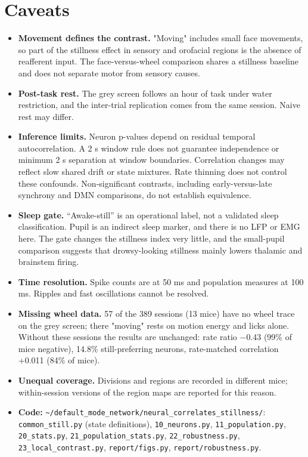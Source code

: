 \documentclass[10pt,a4paper]{article}
\begin{document}
\section{Caveats}
\begin{itemize}
\item \textbf{Movement defines the contrast.} "Moving" includes small face movements, so part of the stillness effect in sensory and orofacial regions is the absence of reafferent input. The face-versus-wheel comparison shares a stillness baseline and does not separate motor from sensory causes.
\item \textbf{Post-task rest.} The grey screen follows an hour of task under water restriction, and the inter-trial replication comes from the same session. Naive rest may differ.
\item \textbf{Inference limits.} Neuron p-values depend on residual temporal autocorrelation. A 2 s window rule does not guarantee independence or minimum 2 s separation at window boundaries. Correlation changes may reflect slow shared drift or state mixtures. Rate thinning does not control these confounds. Non-significant contrasts, including early-versus-late synchrony and DMN comparisons, do not establish equivalence.
\item \textbf{Sleep gate.} ``Awake-still'' is an operational label, not a validated sleep classification. Pupil is an indirect sleep marker, and there is no LFP or EMG here. The gate changes the stillness index very little, and the small-pupil comparison suggests that drowsy-looking stillness mainly lowers thalamic and brainstem firing.
\item \textbf{Time resolution.} Spike counts are at 50 ms and population measures at 100 ms. Ripples and fast oscillations cannot be resolved.
\item \textbf{Missing wheel data.} 57 of the 389 sessions (13 mice) have no wheel trace on the grey screen; there "moving" rests on motion energy and licks alone. Without these sessions the results are unchanged: rate ratio $-$0.43 (99\% of mice negative), 14.8\% still-preferring neurons, rate-matched correlation +0.011 (84\% of mice).
\item \textbf{Unequal coverage.} Divisions and regions are recorded in different mice; within-session versions of the region maps are reported for this reason.
\item \textbf{Code:} \texttt{\textasciitilde{}/\allowbreak{}default\_\allowbreak{}mode\_\allowbreak{}network/\allowbreak{}neural\_\allowbreak{}correlates\_\allowbreak{}stillness/\allowbreak{}}: \texttt{common\_\allowbreak{}still.py} (state definitions), \texttt{10\_\allowbreak{}neurons.py}, \texttt{11\_\allowbreak{}population.py}, \texttt{20\_\allowbreak{}stats.py}, \texttt{21\_\allowbreak{}population\_\allowbreak{}stats.py}, \texttt{22\_\allowbreak{}robustness.py}, \texttt{23\_\allowbreak{}local\_\allowbreak{}contrast.py}, \texttt{report/\allowbreak{}figs.py}, \texttt{report/\allowbreak{}robustness.py}.
\end{itemize}
\end{document}

